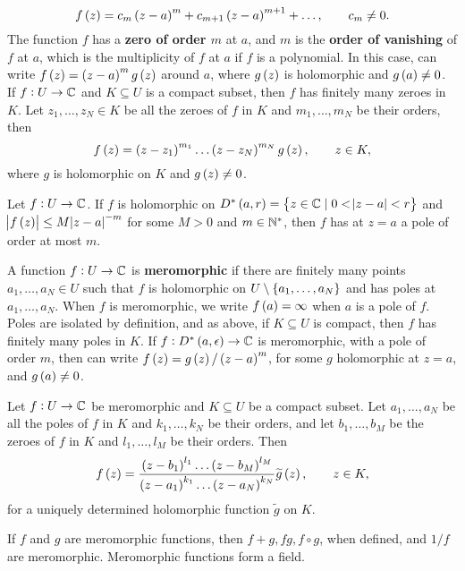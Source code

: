 $$ f\br{z} = c_m\br{z - a}^m + c_{m + 1}\br{z - a}^{m + 1} + \dots, \qquad c_m \ne 0. $$
The function $ f $ has a \textbf{zero of order $ m $} at $ a $, and $ m $ is the \textbf{order of vanishing} of $ f $ at $ a $, which is the multiplicity of $ f $ at $ a $ if $ f $ is a polynomial. In this case, can write $ f\br{z} = \br{z - a}^mg\br{z} $ around $ a $, where $ g\br{z} $ is holomorphic and $ g\br{a} \ne 0 $. If $ f : U \to \mathbb{C} $ and $ K \subseteq U $ is a compact subset, then $ f $ has finitely many zeroes in $ K $. Let $ z_1, \dots, z_N \in K $ be all the zeroes of $ f $ in $ K $ and $ m_1, \dots, m_N $ be their orders, then
$$ f\br{z} = \br{z - z_1}^{m_1} \dots \br{z - z_N}^{m_N}g\br{z}, \qquad z \in K, $$
where $ g $ is holomorphic on $ K $ and $ g\br{z} \ne 0 $.

\begin{proposition}
Let $ f : U \to \mathbb{C} $. If $ f $ is holomorphic on $ D^*\br{a, r} = \cbr{z \in \C \mid 0 < \abs{z - a} < r} $ and $ \abs{f\br{z}} \le M\abs{z - a}^{-m} $ for some $ M > 0 $ and $ m \in \mathbb{N}^* $, then $ f $ has at $ z = a $ a pole of order at most $ m $.
\end{proposition}

A function $ f : U \to \mathbb{C} $ is \textbf{meromorphic} if there are finitely many points $ a_1, \dots, a_N \in U $ such that $ f $ is holomorphic on $ U \setminus \cbr{a_1, \dots, a_N} $ and has poles at $ a_1, \dots, a_N $. When $ f $ is meromorphic, we write $ f\br{a} = \infty $ when $ a $ is a pole of $ f $. Poles are isolated by definition, and as above, if $ K \subseteq U $ is compact, then $ f $ has finitely many poles in $ K $. If $ f : D^*\br{a, \epsilon} \to \C $ is meromorphic, with a pole of order $ m $, then can write $ f\br{z} = g\br{z} / \br{z - a}^m $, for some $ g $ holomorphic at $ z = a $, and $ g\br{a} \ne 0 $.

\begin{proposition}
Let $ f : U \to \mathbb{C} $ be meromorphic and $ K \subseteq U $ be a compact subset. Let $ a_1, \dots, a_N $ be all the poles of $ f $ in $ K $ and $ k_1, \dots, k_N $ be their orders, and let $ b_1, \dots, b_M $ be the zeroes of $ f $ in $ K $ and $ l_1, \dots, l_M $ be their orders. Then
$$ f\br{z} = \dfrac{\br{z - b_1}^{l_1} \dots \br{z - b_M}^{l_M}}{\br{z - a_1}^{k_1} \dots \br{z - a_N}^{k_N}}\widetilde{g}\br{z}, \qquad z \in K, $$
for a uniquely determined holomorphic function $ \widetilde{g} $ on $ K $.
\end{proposition}

If $ f $ and $ g $ are meromorphic functions, then $ f + g, fg, f \circ g $, when defined, and $ 1 / f $ are meromorphic. Meromorphic functions form a field.

